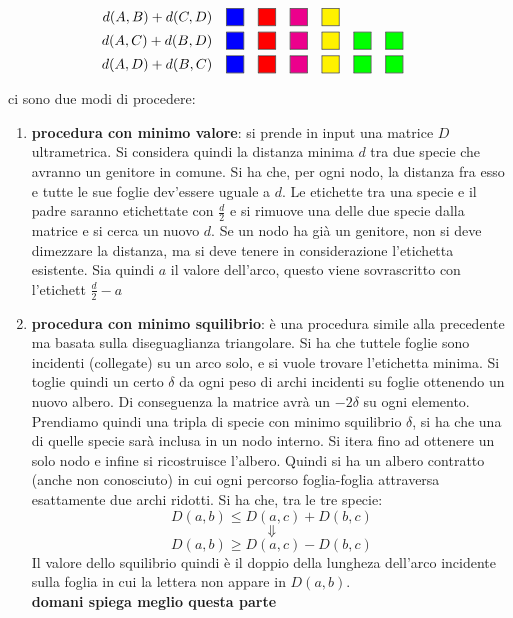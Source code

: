 \documentclass[a4paper,12pt, oneside]{book}
\newcommand{\coloredbox}[1]{\fcolorbox{black}{#1}{\rule{0pt}{6pt}\rule{6pt}{0pt}}\quad}
\begin{document}
\begin{center}
  \begin{align*}
    d(A, B) + d(C, D) & \quad \coloredbox{blue} \coloredbox{red} \coloredbox{magenta} \coloredbox{yellow} \\
    d(A, C) + d(B, D) & \quad \coloredbox{blue} \coloredbox{red} \coloredbox{magenta} \coloredbox{yellow} \coloredbox{green} \coloredbox{green} \\
    d(A, D) + d(B, C) & \quad \coloredbox{blue} \coloredbox{red} \coloredbox{magenta} \coloredbox{yellow} \coloredbox{green} \coloredbox{green}
  \end{align*}
\end{center}
ci sono due modi di procedere:
\begin{enumerate}
  \item \textbf{procedura con minimo valore}: si prende in input una
  matrice $D$ ultrametrica. Si considera quindi la distanza minima $d$
  tra due specie che avranno un genitore in comune. Si ha che, per
  ogni nodo, la distanza fra esso e tutte le sue foglie dev’essere
  uguale a $d$. Le etichette tra una specie e il padre saranno
  etichettate con $\frac{d}{2}$ e si rimuove una delle due specie
  dalla matrice e si cerca un nuovo $d$. Se un nodo ha già un
  genitore, non si deve dimezzare la distanza, ma si deve tenere in
  considerazione l’etichetta esistente. Sia quindi $a$ il valore
  dell'arco, questo viene sovrascritto con l'etichett $\frac{d}{2}-a$
  \item \textbf{procedura con minimo squilibrio}: è una procedura
  simile alla precedente ma basata sulla diseguaglianza
  triangolare. Si ha che tuttele foglie sono incidenti (collegate) su
  un arco solo, e si vuole trovare l’etichetta minima. Si toglie
  quindi un certo $\delta$ da ogni peso di archi incidenti su foglie
  ottenendo un nuovo albero. Di conseguenza la matrice avrà un
  $-2\delta$ su ogni elemento. Prendiamo quindi una tripla di specie
  con minimo squilibrio $\delta$, si ha che una di quelle specie sarà
  inclusa in un nodo interno. Si itera fino ad ottenere un solo nodo e
  infine si ricostruisce l'albero. Quindi si ha un albero contratto
  (anche non conosciuto) in cui ogni percorso foglia-foglia attraversa
  esattamente due archi ridotti. Si ha che, tra le tre specie:
  \[D(a,b)\leq D(a,c)+D(b,c)\]
  \[\Downarrow\]
  \[D(a,b)\geq D(a,c)-D(b,c)\]
  Il valore dello squilibrio quindi è il doppio della lungheza
  dell'arco incidente sulla foglia in cui la lettera non appare in
  $D(a,b)$.\\
  \textbf{domani spiega meglio questa parte}
\end{enumerate}
\end{document}
